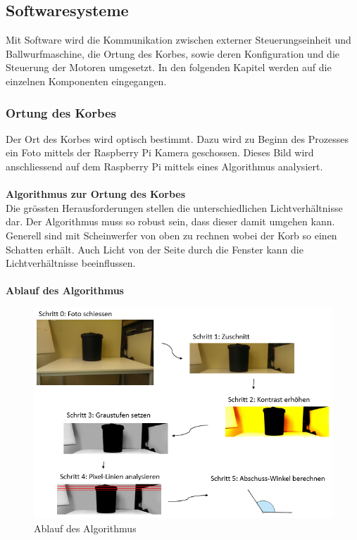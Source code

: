 \subsection{Softwaresysteme}
Mit Software wird die Kommunikation zwischen externer Steuerungseinheit und Ballwurfmaschine, die Ortung des Korbes, sowie deren Konfiguration und die Steuerung der Motoren umgesetzt. In den folgenden Kapitel werden auf die einzelnen Komponenten eingegangen.

\subsubsection{Ortung des Korbes}
Der Ort des Korbes wird optisch bestimmt. Dazu wird zu Beginn des Prozesses ein Foto mittels der Raspberry Pi Kamera geschossen. Dieses Bild wird anschliessend auf dem Raspberry Pi mittels eines Algorithmus analysiert.\\
\\
\textbf{Algorithmus zur Ortung des Korbes}\\
\label{abb-algorithmus-zur-ortung-des-korbes}
Die grössten Herausforderungen stellen die unterschiedlichen Lichtverhältnisse dar. Der Algorithmus muss so robust sein, dass dieser damit umgehen kann. Generell sind mit Scheinwerfer von oben zu rechnen wobei der Korb so einen Schatten erhält. Auch Licht von der Seite durch die Fenster kann die Lichtverhältnisse beeinflussen.\\
\\
\textbf{Ablauf des Algorithmus}
\begin{figure}[h!]
	\centering
	\includegraphics[scale=0.75]{../../fig/ablauf-ortung-des-korbes-algorithmus.png}
	\caption{Ablauf des Algorithmus}
\end{figure}


